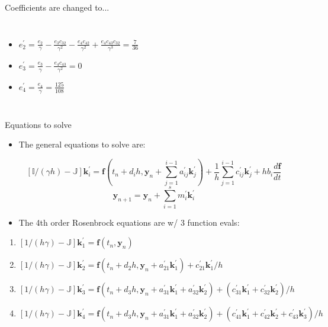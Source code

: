 \documentclass[serif]{beamer}
\begin{document}
\begin{frame}{Coefficients are changed to...}
\begin{footnotesize}
\begin{columns}[T]
\begin{itemize}
    \item $e^\prime_2 = \frac{e_2}{\gamma} - \frac{e_3c_{32}}{\gamma^2} - \frac{e_4c_{42}}{\gamma^2} + \frac{e_4c_{43}c_{32}}{\gamma^3} = \frac{7}{36}$
    \item $e^\prime_3 = \frac{e_3}{\gamma} - \frac{e_4c_{43}}{\gamma^2} = 0$
    \item $e^\prime_4 = \frac{e_4}{\gamma} = \frac{125}{108}$
  \end{itemize}
  \end{columns}
  \end{footnotesize}
\end{frame}

\begin{frame}{Equations to solve}
  \begin{itemize}
    \item  The general equations to solve are:
  \end{itemize}
    \begin{equation}
    \nonumber 
    \left[\mathbb{I}/\left(\gamma h\right) - \mathbb{J}\right]\mathbf{k}^\prime_{i} = \mathbf{f} \left(t_n + d_ih,\mathbf{y}_n + \sum_{j=1}^{i-1}a^\prime_{ij}\mathbf{k}^\prime_{j}\right) 
                   + \frac{1}{h}\sum_{j=1}^{i-1} c^\prime_{ij}\mathbf{k}^\prime_{j}  + hb_i\frac{d\mathbf{f}}{dt}
  \end{equation}
    \begin{equation}
    \nonumber 
    \mathbf{y}_{n+1} = \mathbf{y}_{n} + \sum_{i=1}^s m^\prime_i\mathbf{k}^\prime_i
  \end{equation}
  \begin{itemize}
    \item The 4th order Rosenbrock equations are w/ 3 function evals:
  \end{itemize}
  \begin{enumerate}
    \item \scriptsize $\left[1/\left(h\gamma\right) - \mathbb{J}\right]\mathbf{k}^\prime_1 = \mathbf{f}\left(t_n, \mathbf{y}_n\right)$
    \item $\left[1/\left(h\gamma\right) - \mathbb{J}\right]\mathbf{k}^\prime_2 = \mathbf{f}\left(t_n + d_2h, \mathbf{y}_n + a^\prime_{21}\mathbf{k}^\prime_1\right) + c^\prime_{21}\mathbf{k}^\prime_1/h$
    \item $\left[1/\left(h\gamma\right) - \mathbb{J}\right]\mathbf{k}^\prime_3 = \mathbf{f}\left(t_n + d_3h, \mathbf{y}_n + a^\prime_{31}\mathbf{k}^\prime_1 + a^\prime_{32}\mathbf{k}^\prime_2\right) + \left(c^\prime_{31}\mathbf{k}^\prime_1 + c^\prime_{32}\mathbf{k}^\prime_2\right)/h$
    \item $\left[1/\left(h\gamma\right) - \mathbb{J}\right]\mathbf{k}^\prime_4 = \mathbf{f}\left(t_n + d_3h, \mathbf{y}_n + a^\prime_{31}\mathbf{k}^\prime_1 + a^\prime_{32}\mathbf{k}^\prime_2\right) + \left(c^\prime_{41}\mathbf{k}^\prime_1 + c^\prime_{42}\mathbf{k}^\prime_2 + c^\prime_{43}\mathbf{k}^\prime_3\right)/h$
  \end{enumerate}
\end{frame}
\end{document}
